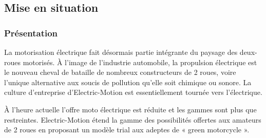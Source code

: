 \documentclass[10pt,fleqn]{article} %
\begin{document}

\vspace{4.5cm}
\pagestyle{fancy}
\thispagestyle{plain}

\def\columnseprulecolor{\color{ocre}}
\setlength{\columnseprule}{0.4pt} 

\def\pathfig{images}

\begin{multicols}{2}


\subsection*{Mise en situation}
\subsubsection*{Présentation}
La motorisation électrique fait désormais partie intégrante du paysage des deux-roues motorisés.
À l'image de l'industrie automobile, la propulsion électrique est le nouveau cheval de bataille de nombreux
constructeurs de 2 roues, voire l'unique alternative aux soucis de pollution qu’elle soit chimique ou sonore. La
culture d’entreprise d’Electric-Motion est essentiellement tournée vers l’électrique.

À l’heure actuelle l’offre moto électrique est réduite et les gammes sont plus que restreintes.
Electric-Motion étend la gamme des possibilités offertes aux amateurs de 2 roues en proposant un modèle trial
aux adeptes de « green motorcycle ».


\end{multicols}
\end{document}
